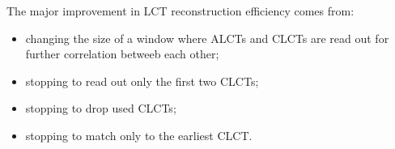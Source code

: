 The major improvement in LCT reconstruction efficiency comes from:
\begin{itemize}
	\item changing the size of a window where ALCTs and CLCTs are read out for further correlation betweeb each other;
	\item stopping to read out only the first two CLCTs;
	\item stopping to drop used CLCTs;
	\item stopping to match only to the earliest CLCT.
\end{itemize}

\newpage
